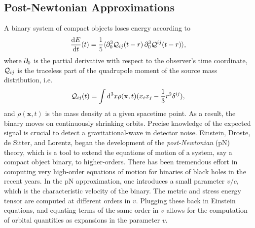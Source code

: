 \subsection{Post-{N}ewtonian Approximations}
\label{sec:PNWaveforms}

A binary system of compact objects loses energy according to 
%
\begin{equation}
\label{eq:energy_loss}
\frac{\D E}{\D t}(t) = \frac{1}{5}\langle \pd_0^3\Quad_{ij}(t-r)\,\pd_0^3\Quad^{ij}(t-r)\rangle,
\end{equation}
%
where $\partial_0$ is the partial derivative with respect to the observer's
time coordinate, $\mathcal{Q}_{ij}$ is the traceless part of the quadrupole moment of the
source mass distribution, i.e.
%
\begin{equation}
\mathcal{Q}_{ij}(t) = \int \mathrm{d}^3 x \rho(\mathbf{x},t)(x_i x_j - \frac{1}{3}r^2 \delta^{ij}),
\end{equation}
% 
and $\rho(\mathbf{x},t)$ is the mass density at a given spacetime point.
As a result, the binary moves on continuously shrinking orbits.
Precise knowledge of the expected signal is crucial to detect a gravitational-wave
in detector noise. Einstein, Droste, de Sitter, and Lorentz,
began the development of the {\it post-Newtonian} (pN) theory, which is a
tool to extend the equations of motion of a system, say a compact object 
binary, to higher-orders. There has been tremendous effort in computing 
very high-order equations of motion for binaries of black holes in the
recent years. In the pN approximation, one introduces a small parameter 
$v/c$, which is the characteristic velocity of the binary.
The metric and
stress energy tensor are computed at different orders in 
$v$. Plugging these back in Einstein equations, and equating terms of 
the same order in $v$ allows for the computation of orbital quantities
as expansions in the parameter $v$. 




